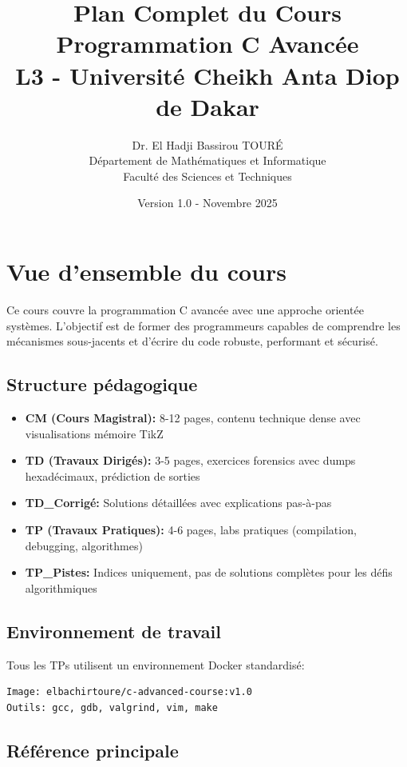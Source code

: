 \documentclass[10pt,a4paper]{article}
\title{\textbf{Plan Complet du Cours}\\
\LARGE Programmation C Avancée\\
\large L3 - Université Cheikh Anta Diop de Dakar}
\author{Dr. El Hadji Bassirou TOURÉ\\
Département de Mathématiques et Informatique\\
Faculté des Sciences et Techniques}
\date{Version 1.0 - Novembre 2025}
\begin{document}
\maketitle

\tableofcontents
\newpage

\section*{Vue d'ensemble du cours}

Ce cours couvre la programmation C avancée avec une approche orientée systèmes. L'objectif est de former des programmeurs capables de comprendre les mécanismes sous-jacents et d'écrire du code robuste, performant et sécurisé.

\subsection*{Structure pédagogique}

\begin{itemize}[leftmargin=2cm]
\item \textbf{CM (Cours Magistral):} 8-12 pages, contenu technique dense avec visualisations mémoire TikZ
\item \textbf{TD (Travaux Dirigés):} 3-5 pages, exercices forensics avec dumps hexadécimaux, prédiction de sorties
\item \textbf{TD\_Corrigé:} Solutions détaillées avec explications pas-à-pas
\item \textbf{TP (Travaux Pratiques):} 4-6 pages, labs pratiques (compilation, debugging, algorithmes)
\item \textbf{TP\_Pistes:} Indices uniquement, pas de solutions complètes pour les défis algorithmiques
\end{itemize}

\subsection*{Environnement de travail}

Tous les TPs utilisent un environnement Docker standardisé:
\begin{verbatim}
Image: elbachirtoure/c-advanced-course:v1.0
Outils: gcc, gdb, valgrind, vim, make
\end{verbatim}

\subsection*{Référence principale}
\end{document}
